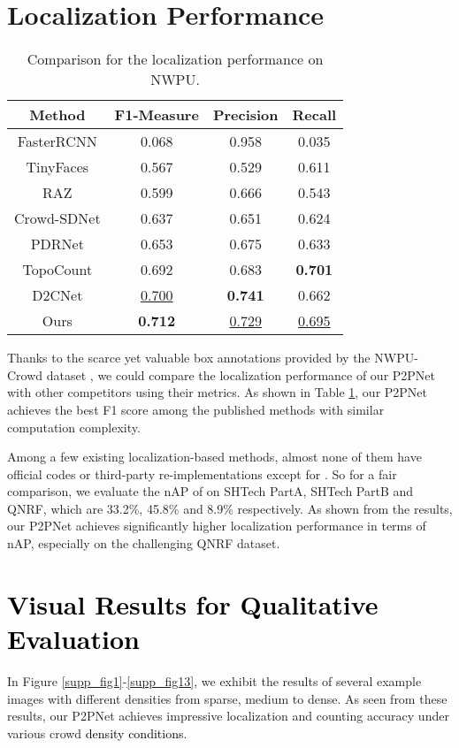 \documentclass[10pt,twocolumn,letterpaper]{article}
\newcommand{\ywu}[1]{\textcolor{black}{#1}}
\begin{document}
\section{Localization Performance}\label{loc}
\begin{table}[!ht]
\setlength\tabcolsep{8pt}
  \centering
  \begin{tabular}{c|c c c}
    \toprule[1pt]
    Method & F1-Measure & Precision & Recall\\
    \hline
    FasterRCNN \cite{ren2016faster} &  0.068 &  0.958 & 0.035 \\
    TinyFaces \cite{hu2017finding}&  0.567  &  0.529 & 0.611 \\
    RAZ \cite{liu2019recurrent}&   0.599 &  0.666 &  0.543\\
Crowd-SDNet \cite{wang2021self} &  0.637  & 0.651  & 0.624  \\
    PDRNet \cite{li2019pdr}&  0.653 & 0.675  & 0.633  \\
    TopoCount \cite{abousamra2020localization} & 0.692  & 0.683  & \textbf{0.701} \\
    D2CNet \cite{cheng2021decoupled} & \underline{0.700} & \textbf{0.741}  & 0.662 \\
    Ours &\textbf{0.712} & \underline{0.729}  & \underline{0.695} \\
    \bottomrule[1pt]
  \end{tabular}
  \caption{Comparison for the localization performance on NWPU.}\label{tab:f1}
\end{table}
Thanks to the scarce yet valuable box annotations provided by the NWPU-Crowd dataset \cite{wang2020nwpu}, we could compare the localization performance of our P2PNet with other competitors using their metrics. As shown in Table \ref{tab:f1}, our P2PNet achieves the best F1 score among the published methods with similar computation complexity.

Among a few existing localization-based methods, almost none of them have official codes
or third-party re-implementations except for \cite{sam2020locate}. So for a fair comparison, we evaluate the nAP of \cite{sam2020locate} on SHTech
PartA, SHTech PartB and QNRF, which are 33.2\%, 45.8\% and 8.9\% respectively. As shown from the results, our P2PNet achieves significantly higher localization performance in terms of nAP, especially on the challenging QNRF dataset.

\section{\ywu{Visual Results for Qualitative Evaluation}}\label{vis}
In Figure \ref{supp_fig1}-\ref{supp_fig13}, we exhibit the results of several example images with different densities from sparse, medium to dense. As seen from these results, our P2PNet achieves impressive localization and counting accuracy under various crowd \ywu{density conditions}.
\end{document}
